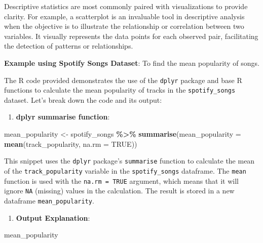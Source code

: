 \documentclass[
]{book}
\newenvironment{Shaded}{\begin{snugshade}}{\end{snugshade}}
\newcommand{\AttributeTok}[1]{\textcolor[rgb]{0.13,0.29,0.53}{#1}}
\newcommand{\ConstantTok}[1]{\textcolor[rgb]{0.56,0.35,0.01}{#1}}
\newcommand{\FunctionTok}[1]{\textcolor[rgb]{0.13,0.29,0.53}{\textbf{#1}}}
\newcommand{\NormalTok}[1]{#1}
\newcommand{\OtherTok}[1]{\textcolor[rgb]{0.56,0.35,0.01}{#1}}
\newcommand{\SpecialCharTok}[1]{\textcolor[rgb]{0.81,0.36,0.00}{\textbf{#1}}}
\providecommand{\tightlist}{%
  \setlength{\itemsep}{0pt}\setlength{\parskip}{0pt}}
\begin{document}
Descriptive statistics are most commonly paired with visualizations to provide clarity. For example, a scatterplot is an invaluable tool in descriptive analysis when the objective is to illustrate the relationship or correlation between two variables. It visually represents the data points for each observed pair, facilitating the detection of patterns or relationships.

\textbf{Example using Spotify Songs Dataset}: To find the mean popularity of songs.

The R code provided demonstrates the use of the \texttt{dplyr} package and base R functions to calculate the mean popularity of tracks in the \texttt{spotify\_songs} dataset. Let's break down the code and its output:

\begin{enumerate}
\def\labelenumi{\arabic{enumi}.}
\tightlist
\item
  \textbf{dplyr summarise function}:
\end{enumerate}

\begin{Shaded}
\begin{Highlighting}[]
\NormalTok{mean\_popularity }\OtherTok{\textless{}{-}}\NormalTok{ spotify\_songs }\SpecialCharTok{\%\textgreater{}\%}
  \FunctionTok{summarise}\NormalTok{(}\AttributeTok{mean\_popularity =} \FunctionTok{mean}\NormalTok{(track\_popularity, }\AttributeTok{na.rm =} \ConstantTok{TRUE}\NormalTok{))}
\end{Highlighting}
\end{Shaded}

This snippet uses the \texttt{dplyr} package's \texttt{summarise} function to calculate the mean of the \texttt{track\_popularity} variable in the \texttt{spotify\_songs} dataframe. The \texttt{mean} function is used with the \texttt{na.rm\ =\ TRUE} argument, which means that it will ignore \texttt{NA} (missing) values in the calculation. The result is stored in a new dataframe \texttt{mean\_popularity}.

\begin{enumerate}
\def\labelenumi{\arabic{enumi}.}
\setcounter{enumi}{1}
\tightlist
\item
  \textbf{Output Explanation}:
\end{enumerate}

\begin{Shaded}
\begin{Highlighting}[]
\NormalTok{mean\_popularity}
\end{Highlighting}
\end{Shaded}
\end{document}
